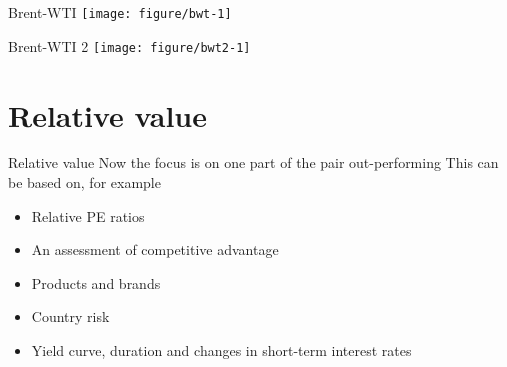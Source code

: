 \documentclass[14pt,xcolor=pdftex,dvipsnames,table]{beamer}\usepackage[]{graphicx}\usepackage[]{color}
\makeatletter
\def\maxwidth{ %
  \ifdim\Gin@nat@width>\linewidth
    \linewidth
  \else
    \Gin@nat@width
  \fi
}
\newenvironment{knitrout}{}{} %
\makeatother
\begin{document}
\begin{frame}{Brent-WTI}
\begin{knitrout}
\color{fgcolor}
\texttt{[image: figure/bwt-1]} 

\end{knitrout}
\end{frame}

\begin{frame}{Brent-WTI 2}
\begin{knitrout}
\color{fgcolor}
\texttt{[image: figure/bwt2-1]} 

\end{knitrout}
\end{frame}

\section{Relative value}
\begin{frame}{Relative value}
Now the focus is on one part of the pair out-performing
This can be based on, for example
\pause
\begin{itemize}[<+-| alert@+>]
\item Relative PE ratios
\item An assessment of competitive advantage
\item Products and brands
\item Country risk
\item Yield curve, duration and changes in short-term interest rates
\end{itemize}
\end{frame}
\end{document}
